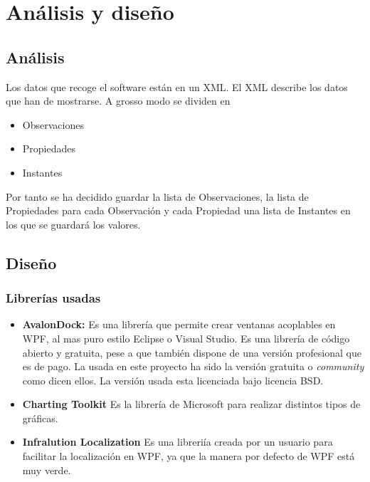 \chapter{An\'{a}lisis y dise\~{n}o}


\section{An\'{a}lisis}
Los datos que recoge el software est\'an en un XML. El XML describe los datos que han de mostrarse. A grosso modo se dividen en
\begin{itemize}
	\item Observaciones
	\item Propiedades
	\item Instantes
\end{itemize}

Por tanto se ha decidido guardar la lista de Observaciones, la lista de Propiedades para cada Observaci\'on y cada Propiedad
una lista de Instantes en los que se guardar\'a los valores.

\section{Dise\~{n}o}

\subsection{Librer\'{i}as usadas}
\begin{itemize}
    \item \textbf{AvalonDock:} 
    Es una librer\'{i}a que permite crear ventanas acoplables en WPF, al mas puro estilo Eclipse o Visual Studio. Es una librer\'{i}a de
    c\'{o}digo abierto y gratuita, pese a que tambi\'{e}n dispone de una versi\'{o}n profesional que es de pago. La usada en este proyecto
    ha sido la versi\'{o}n gratuita o \emph{community} como dicen ellos. La versi\'{o}n usada esta licenciada bajo licencia BSD.
    \item \textbf{Charting Toolkit}
    Es la librer\'{i}a de Microsoft para realizar distintos tipos de gr\'{a}ficas.
    \item \textbf{Infralution Localization}
    Es una libreri\'ia creada por un usuario para facilitar la localizaci\'on en WPF, ya que la manera por defecto de WPF est\'a
    muy verde.
\end{itemize}

